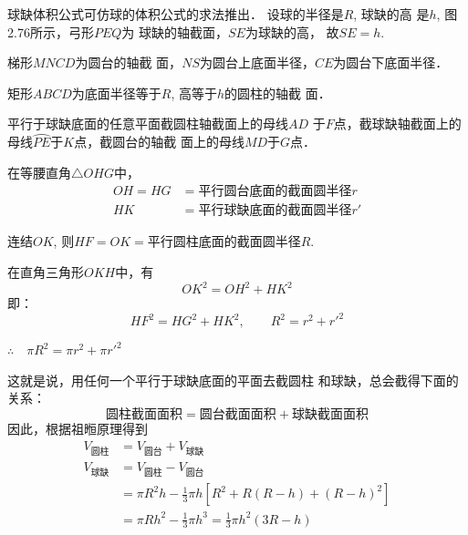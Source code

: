 球缺体积公式可仿球的体积公式的求法推出．
设球的半径是$R$, 球缺的高
是$h$, 图2.76所示，弓形$PEQ$为
球缺的轴截面，$SE$为球缺的高，
故$SE=h$.
\begin{figure}[htp]
    \centering
{}
    \caption{}
\end{figure}

梯形$MNCD$为圆台的轴截
面，$NS$为圆台上底面半径，$CE$为圆台下底面半径．

矩形$ABCD$为底面半径等于$R$, 高等于$h$的圆柱的轴截
面．

平行于球缺底面的任意平面截圆柱轴截面上的母线$AD$
于$F$点，截球缺轴截面上的母线$\wideparen{PE}$于$K$点，截圆台的轴截
面上的母线$MD$于$G$点．

在等腰直角$\triangle OHG$中，
\[\begin{split}
    OH=HG&=\text{平行圆台底面的截面圆半径}r\\
HK&=\text{平行球缺底面的截面圆半径}r'
\end{split}\]

连结$OK$, 则$HF=OK=$平行圆柱底面的截面圆半径$R$. 

在直角三角形$OKH$中，有
\[OK^2=OH^2+HK^2\]
即：
\[HF^2=HG^2+HK^2,\qquad R^2=r^2+{r'}^2\]

$\therefore\quad \pi R^2=\pi r^2+\pi {r'}^2$

这就是说，用任何一个平行于球缺底面的平面去截圆柱
和球缺，总会截得下面的关系：
\[\text{圆柱截面面积}=\text{圆台截面面积}+\text{球缺截面面积}\]
因此，根据祖暅原理得到
\[\begin{split}
 V_{\text{圆柱}}&=V_{\text{圆台}}+V_{\text{球缺}}\\
V_{\text{球缺}}&=V_{\text{圆柱}}-V_{\text{圆台}}\\
& =  \pi R^2h-\frac{1}{3}\pi h[R^2+R(R-h)+(R-h)^2]\\
&=\pi Rh^2-\frac{1}{3}\pi h^3=\frac{1}{3}\pi h^2(3R-h)
\end{split}\]

